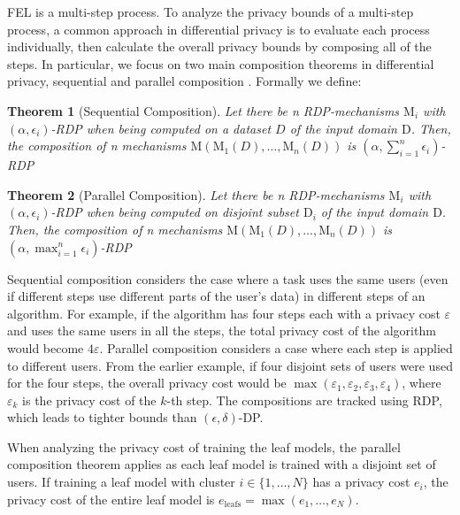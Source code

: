 \documentclass{article}
\newcommand{\eps}{\varepsilon}
\begin{document}
FEL is a multi-step process. To analyze the privacy bounds of a multi-step process, a common approach in differential privacy is to evaluate each process individually, then calculate the overall privacy bounds by composing all of the steps. In particular, we focus on two main composition theorems in differential privacy, sequential and parallel composition \cite{Mani-dwork2009differential}. Formally we define:


\textbf{Theorem 1} (Sequential Composition). \textit{Let there be n RDP-mechanisms $\mathrm{M}_i$ with $(\alpha, \epsilon_i)$-RDP when being computed on a dataset $D$ of the input domain $\mathrm{D}$. Then, the composition of n mechanisms $\mathrm{M}(\mathrm{M}_1(D),\dots,\mathrm{M}_n(D))$ is $(\alpha, \sum^n_{i=1} \epsilon_i)$-RDP}


\textbf{Theorem 2} (Parallel Composition). \textit{Let there be n RDP-mechanisms $\mathrm{M}_i$ with $(\alpha, \epsilon_i)$-RDP when being computed on disjoint subset $\mathrm{D}_i$ of the input domain $\mathrm{D}$. Then, the composition of n mechanisms $\mathrm{M}(\mathrm{M}_1(D),\dots,\mathrm{M}_n(D))$ is $(\alpha, \max^n_{i=1} \epsilon_i)$-RDP}

Sequential composition considers the case where a task uses the same users (even if different steps use different parts of the user’s data) in different steps of an algorithm. For example, if the algorithm has four steps each with a privacy cost $\eps$ and uses the same users in all the steps, the total privacy cost of the algorithm would become $4\eps$.
%
Parallel composition considers a case where each step is applied to different users. From the earlier example, if four disjoint sets of users were used for the four steps, the overall privacy cost would be $\max(\eps_1,\eps_2,\eps_3,\eps_4)$, where $\eps_k$ is the privacy cost of the $k$-th step. The compositions are tracked using RDP, which leads to tighter bounds than $(\epsilon, \delta)$-DP.

When analyzing the privacy cost of training the leaf models, the parallel composition theorem applies as each leaf model is trained with a disjoint set of users. If training a leaf model with cluster $i \in \{1,\dots,N\}$ has a privacy cost $e_i$, the privacy cost of the entire leaf model is $e_\mathrm{leafs} = \max(e_1,\dots, e_N)$.
\end{document}
